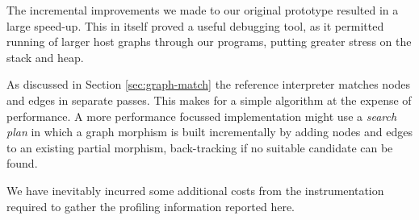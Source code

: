 The incremental improvements we made to our original prototype resulted in a large speed-up. This in itself proved a useful debugging tool, as it permitted running of larger host graphs through our programs, putting greater stress on the stack and heap.

As discussed in Section \ref{sec:graph-match} the reference interpreter matches nodes and edges in separate passes. This makes for a simple algorithm at the expense of performance. A more performance focussed implementation might use a \textit{search plan}\cite{Horvath-Varro07} in which a graph morphism is built incrementally by adding nodes and edges to an existing partial morphism, back-tracking if no suitable candidate can be found.




We have inevitably incurred some additional costs from the instrumentation required to gather the profiling information reported here.








